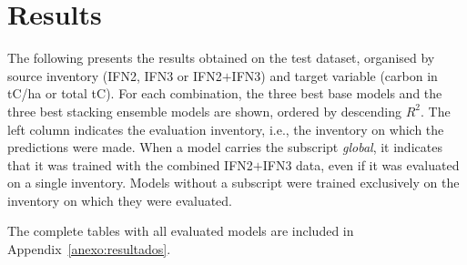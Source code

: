 \section{Results}
\label{sec:resultados}

The following presents the results obtained on the test dataset, organised by source inventory (IFN2, IFN3 or IFN2$+$IFN3) and target variable (carbon in tC/ha or total tC). For each combination, the three best base models and the three best stacking ensemble models are shown, ordered by descending $R^2$. The left column indicates the evaluation inventory, i.e., the inventory on which the predictions were made. When a model carries the subscript \textit{global}, it indicates that it was trained with the combined IFN2$+$IFN3 data, even if it was evaluated on a single inventory. Models without a subscript were trained exclusively on the inventory on which they were evaluated.


The complete tables with all evaluated models are included in Appendix~\ref{anexo:resultados}.

